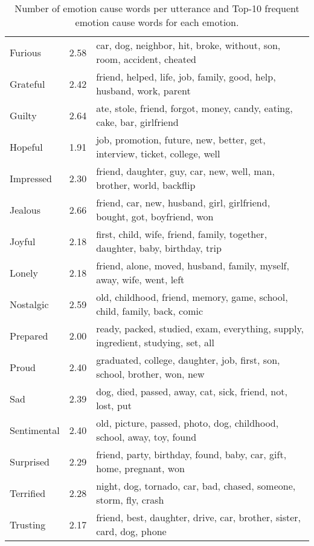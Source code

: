\documentclass[11pt]{article}
\begin{document}
{\begin{table*}[t!]
\begin{center}
\begin{tabular}{lcl}
        Furious       & 2.58 & car, dog, neighbor, hit, broke, without, son, room, accident, cheated \\
        Grateful      & 2.42 & friend, helped, life, job, family, good, help, husband, work, parent \\
        Guilty        & 2.64 & ate, stole, friend, forgot, money, candy, eating, cake, bar, girlfriend \\
        Hopeful       & 1.91 & job, promotion, future, new, better, get, interview, ticket, college, well \\
        Impressed     & 2.30 & friend, daughter, guy, car, new, well, man, brother, world, backflip \\
        Jealous       & 2.66 & friend, car, new, husband, girl, girlfriend, bought, got, boyfriend, won \\
        Joyful        & 2.18 & first, child, wife, friend, family, together, daughter, baby, birthday, trip \\
        Lonely        & 2.18 & friend, alone, moved, husband, family, myself, away, wife, went, left \\
        Nostalgic     & 2.59 & old, childhood, friend, memory, game, school, child, family, back, comic \\
        Prepared      & 2.00 & ready, packed, studied, exam, everything, supply, ingredient, studying, set, all \\
        Proud         & 2.40 & graduated, college, daughter, job, first, son, school, brother, won, new \\
        Sad           & 2.39 & dog, died, passed, away, cat, sick, friend, not, lost, put \\
        Sentimental   & 2.40 & old, picture, passed, photo, dog, childhood, school, away, toy, found \\
        Surprised     & 2.29 & friend, party, birthday, found, baby, car, gift, home, pregnant, won \\
        Terrified     & 2.28 & night, dog, tornado, car, bad, chased, someone, storm, fly, crash \\
        Trusting      & 2.17 & friend, best, daughter, drive, car, brother, sister, card, dog, phone \\
        \bottomrule
    \end{tabular}
    \caption{
        Number of emotion cause words per utterance and Top-10 frequent emotion cause words for each emotion.
    }
    \label{tab:top10_frequent_words}
\end{center}\end{table*}}
\end{document}
